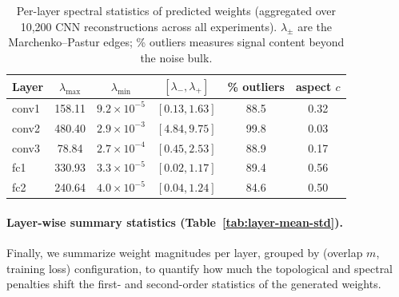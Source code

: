 \documentclass{article}
\begin{document}
\begin{table}[t]
  \centering
  \caption{Per-layer spectral statistics of predicted weights
  (aggregated over 10,200 CNN reconstructions across all experiments).
  $\lambda_\pm$ are the Marchenko--Pastur edges; \% outliers measures
  signal content beyond the noise bulk.}
  \label{tab:eig-stats}
  \begin{tabular}{lccccc}
    \toprule
    Layer & $\lambda_{\max}$ & $\lambda_{\min}$ &
    $[\lambda_-,\lambda_+]$ & \% outliers & aspect $c$ \\
    \midrule
    conv1 & 158.11 & $9.2{\times}10^{-5}$ & $[0.13, 1.63]$ & 88.5 & 0.32 \\
    conv2 & 480.40 & $2.9{\times}10^{-3}$ & $[4.84, 9.75]$ & 99.8 & 0.03 \\
    conv3 & 78.84 & $2.7{\times}10^{-4}$ & $[0.45, 2.53]$ & 88.9 & 0.17 \\
    fc1   & 330.93 & $3.3{\times}10^{-5}$ & $[0.02, 1.17]$ & 89.4 & 0.56 \\
    fc2   & 240.64 & $4.0{\times}10^{-5}$ & $[0.04, 1.24]$ & 84.6 & 0.50 \\
    \bottomrule
  \end{tabular}
\end{table}

\paragraph{Layer-wise summary statistics (Table~\ref{tab:layer-mean-std}).}
Finally, we summarize weight magnitudes per layer, grouped by
(overlap $m$, training loss) configuration, to quantify how much the
topological and spectral penalties shift the first- and second-order
statistics of the generated weights.
\end{document}
